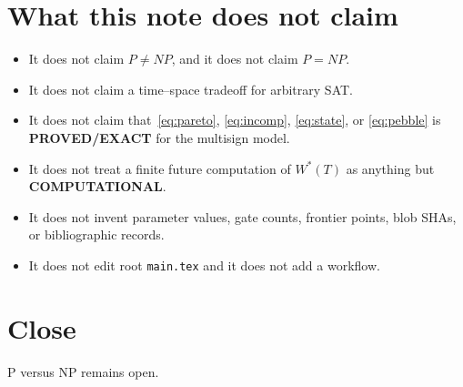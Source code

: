 \documentclass[11pt]{article}
\begin{document}
\section{What this note does not claim}
\begin{itemize}
\item It does not claim \(P\neq NP\), and it does not claim \(P=NP\).
\item It does not claim a time--space tradeoff for arbitrary SAT.
\item It does not claim that~\eqref{eq:pareto}, \eqref{eq:incomp}, \eqref{eq:state}, or \eqref{eq:pebble} is \textbf{PROVED/EXACT} for the multisign model.
\item It does not treat a finite future computation of \(W^{*}(T)\) as anything but \textbf{COMPUTATIONAL}.
\item It does not invent parameter values, gate counts, frontier points, blob SHAs, or bibliographic records.
\item It does not edit root \texttt{main.tex} and it does not add a workflow.
\end{itemize}

\section*{Close}
P versus NP remains open.
\end{document}
